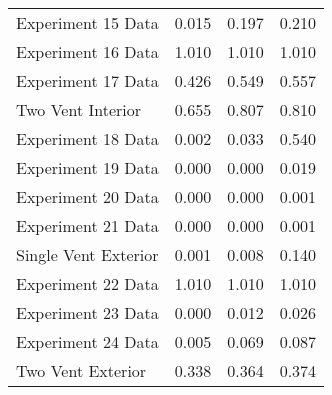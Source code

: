 \begin{tabular}{lrrr}
Experiment 15 Data   &            0.015 &            0.197 &      0.210 \\
Experiment 16 Data   &            1.010 &            1.010 &      1.010 \\
Experiment 17 Data   &            0.426 &            0.549 &      0.557 \\
Two Vent Interior    &            0.655 &            0.807 &      0.810 \\
Experiment 18 Data   &            0.002 &            0.033 &      0.540 \\
Experiment 19 Data   &            0.000 &            0.000 &      0.019 \\
Experiment 20 Data   &            0.000 &            0.000 &      0.001 \\
Experiment 21 Data   &            0.000 &            0.000 &      0.001 \\
Single Vent Exterior &            0.001 &            0.008 &      0.140 \\
Experiment 22 Data   &            1.010 &            1.010 &      1.010 \\
Experiment 23 Data   &            0.000 &            0.012 &      0.026 \\
Experiment 24 Data   &            0.005 &            0.069 &      0.087 \\
Two Vent Exterior    &            0.338 &            0.364 &      0.374 \\
\bottomrule
\end{tabular}
